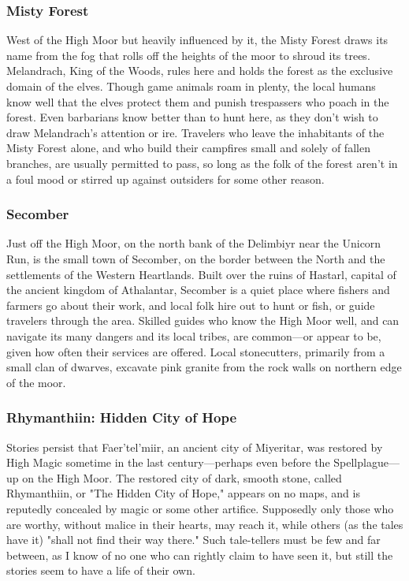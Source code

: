 \documentclass[10pt,a4paper,twoside,twocolumn,openany,bg=print,nodeprecatedcode]{dndbook}
\begin{document}
\subsubsection{Misty Forest}
West of the High Moor but heavily influenced by it, the Misty Forest draws its name from the fog that rolls off the heights of the moor to shroud its trees. Melandrach, King of the Woods, rules here and holds the forest as the exclusive domain of the elves. Though game animals roam in plenty, the local humans know well that the elves protect them and punish trespassers who poach in the forest. Even barbarians know better than to hunt here, as they don't wish to draw Melandrach's attention or ire.
Travelers who leave the inhabitants of the Misty Forest alone, and who build their campfires small and solely of fallen branches, are usually permitted to pass, so long as the folk of the forest aren't in a foul mood or stirred up against outsiders for some other reason.
\subsubsection{Secomber}
Just off the High Moor, on the north bank of the Delimbiyr near the Unicorn Run, is the small town of Secomber, on the border between the North and the settlements of the Western Heartlands. Built over the ruins of Hastarl, capital of the ancient kingdom of Athalantar, Secomber is a quiet place where fishers and farmers go about their work, and local folk hire out to hunt or fish, or guide travelers through the area. Skilled guides who know the High Moor well, and can navigate its many dangers and its local tribes, are common—or appear to be, given how often their services are offered. Local stonecutters, primarily from a small clan of dwarves, excavate pink granite from the rock walls on northern edge of the moor.
\subsubsection{Rhymanthiin: Hidden City of Hope}
Stories persist that Faer'tel'miir, an ancient city of Miyeritar, was restored by High Magic sometime in the last century—perhaps even before the Spellplague—up on the High Moor. The restored city of dark, smooth stone, called Rhymanthiin, or "The Hidden City of Hope," appears on no maps, and is reputedly concealed by magic or some other artifice. Supposedly only those who are worthy, without malice in their hearts, may reach it, while others (as the tales have it) "shall not find their way there." Such tale-tellers must be few and far between, as I know of no one who can rightly claim to have seen it, but still the stories seem to have a life of their own.
\end{document}
